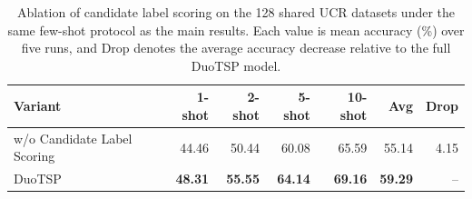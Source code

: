 \begin{table}[t]
\centering
\caption{Ablation of candidate label scoring on the 128 shared UCR datasets under the same few-shot protocol as the main results. Each value is mean accuracy (\%) over five runs, and Drop denotes the average accuracy decrease relative to the full DuoTSP model.}
\label{tab:ablation-decoding}
\begin{tabular}{lrrrrrr}
\toprule
Variant & 1-shot & 2-shot & 5-shot & 10-shot & Avg & Drop \\
\midrule
w/o Candidate Label Scoring & 44.46 & 50.44 & 60.08 & 65.59 & 55.14 & 4.15 \\
DuoTSP & \textbf{48.31} & \textbf{55.55} & \textbf{64.14} & \textbf{69.16} & \textbf{59.29} & -- \\
\bottomrule
\end{tabular}
\end{table}
